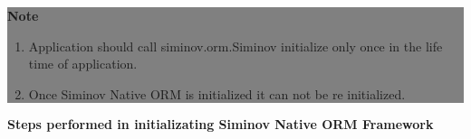 		\begin{center}
			\colorbox{grey}{
				\parbox[t]{.8\linewidth}{
					\fontsize{11pt}{11pt}\selectfont %
					\vspace*{0.1cm} %
		
					\hfill \textbf{Note} \\

					\begin{enumerate}

						\item \small Application should call siminov.orm.Siminov initialize only once in the life time of application.

						\item \small Once Siminov Native ORM is initialized it can not be re initialized.

					\end{enumerate}

					\vspace*{0.0cm} %
				}
			}

		\end{center}


\par
\textbf{Steps performed in initializating Siminov Native ORM Framework}

